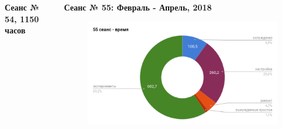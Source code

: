 \documentclass[dvipsnames] {beamer}
\begin{document}
\begin{frame}
\begin{columns}[t]
\begin{block}{\bf \centering \footnotesize Сеанс № 54, 1150 часов}
\begin{figure}[H]
       \end{figure}
     \end{block}
      \begin{block}{\bf \centering \footnotesize Сеанс № 55: Февраль - Апрель, 2018}
      \begin{figure}[H]
        \includegraphics[width=1.\linewidth]{run55.png} \\
      \end{figure}
    \end{block}    
  \end{columns}  
\end{frame}
\end{document}

